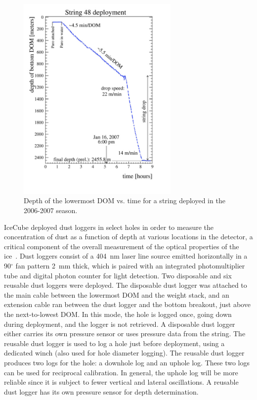 \begin{figure}[!h]
 \centering
\includegraphics[width=0.70\textwidth]{graphics/drill/String48_profile.pdf}
\caption{Depth of the lowermost DOM vs. time for a string deployed in the 2006-2007 season.}
\label{fig:deploytime}
\end{figure}

IceCube deployed dust loggers in select holes in order to measure the concentration of dust as a function of depth at various locations in the detector, a critical component of the overall measurement of the optical properties of the ice~\cite{Aartsen:2013rt,citeulike:2998650}. Dust loggers consist of a 404~nm laser line source emitted horizontally in a 90$^{\circ}$
fan pattern 2~mm thick, which is paired with an integrated
photomultiplier tube and digital photon counter for light
detection. Two disposable and six reusable dust loggers were deployed. The disposable dust logger was attached to the main cable between the lowermost DOM and the weight stack, and an extension cable ran between the dust logger and the bottom breakout, just above the next-to-lowest DOM. In this mode, the hole is logged once, going down during deployment, and the logger is not retrieved. A disposable dust logger either carries its own pressure sensor or uses pressure data from the string. The reusable dust logger is used to log a hole just before deployment, using a dedicated winch (also used for hole diameter logging). The reusable dust logger produces two logs for the hole: a downhole log and an uphole log. These two logs can be used for reciprocal calibration. In general, the uphole log will be more reliable since it is subject to fewer vertical and lateral oscillations. A reusable dust logger has its own pressure sensor for depth determination. 

